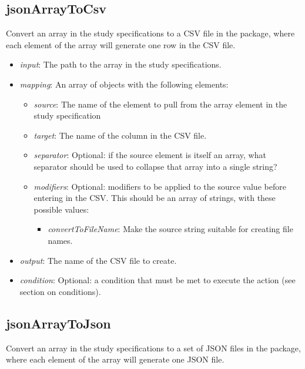 \documentclass[]{article}
\providecommand{\tightlist}{%
  \setlength{\itemsep}{0pt}\setlength{\parskip}{0pt}}
\begin{document}
\hypertarget{jsonarraytocsv}{%
\subsection{jsonArrayToCsv}\label{jsonarraytocsv}}

Convert an array in the study specifications to a CSV file in the
package, where each element of the array will generate one row in the
CSV file.

\begin{itemize}
\tightlist
\item
  \emph{input}: The path to the array in the study specifications.
\item
  \emph{mapping}: An array of objects with the following elements:

  \begin{itemize}
  \tightlist
  \item
    \emph{source}: The name of the element to pull from the array
    element in the study specification
  \item
    \emph{target}: The name of the column in the CSV file.
  \item
    \emph{separator}: Optional: if the source element is itself an
    array, what separator should be used to collapse that array into a
    single string?
  \item
    \emph{modifiers}: Optional: modifiers to be applied to the source
    value before entering in the CSV. This should be an array of
    strings, with these possible values:

    \begin{itemize}
    \tightlist
    \item
      \emph{convertToFileName}: Make the source string suitable for
      creating file names.
    \end{itemize}
  \end{itemize}
\item
  \emph{output}: The name of the CSV file to create.
\item
  \emph{condition}: Optional: a condition that must be met to execute
  the action (see section on conditions).
\end{itemize}

\hypertarget{jsonarraytojson}{%
\subsection{jsonArrayToJson}\label{jsonarraytojson}}

Convert an array in the study specifications to a set of JSON files in
the package, where each element of the array will generate one JSON
file.
\end{document}
